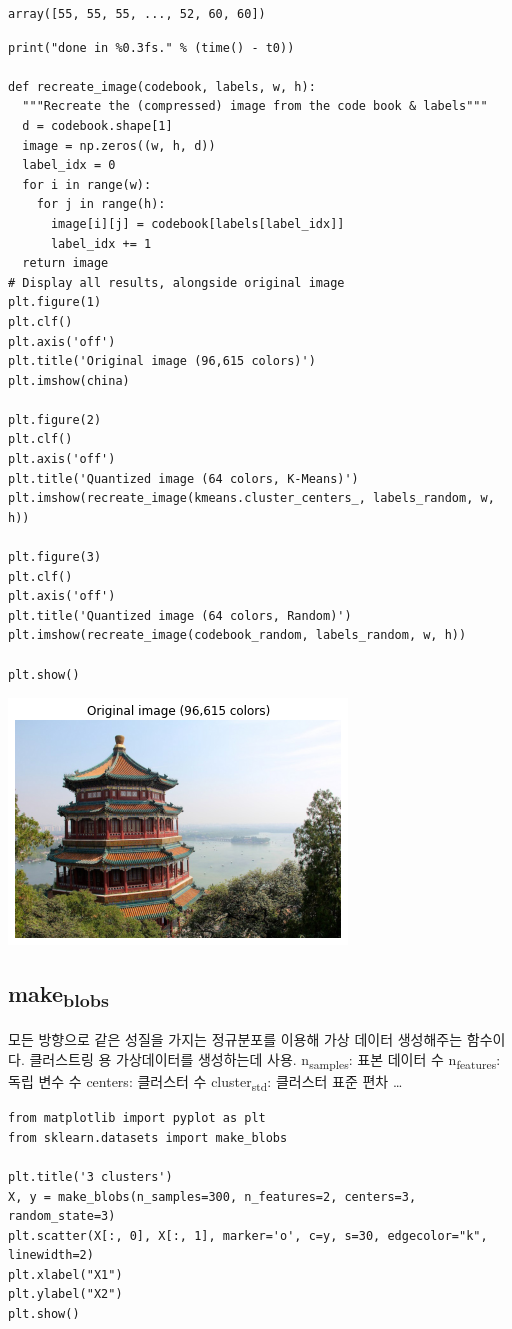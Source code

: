 \documentclass[11pt]{article}
\begin{document}
\begin{verbatim}
array([55, 55, 55, ..., 52, 60, 60])
\end{verbatim}

\begin{verbatim}
print("done in %0.3fs." % (time() - t0))

def recreate_image(codebook, labels, w, h):
  """Recreate the (compressed) image from the code book & labels"""
  d = codebook.shape[1]
  image = np.zeros((w, h, d))
  label_idx = 0
  for i in range(w):
    for j in range(h):
      image[i][j] = codebook[labels[label_idx]]
      label_idx += 1
  return image
# Display all results, alongside original image
plt.figure(1)
plt.clf()
plt.axis('off')
plt.title('Original image (96,615 colors)')
plt.imshow(china)

plt.figure(2)
plt.clf()
plt.axis('off')
plt.title('Quantized image (64 colors, K-Means)')
plt.imshow(recreate_image(kmeans.cluster_centers_, labels_random, w, h))

plt.figure(3)
plt.clf()
plt.axis('off')
plt.title('Quantized image (64 colors, Random)')
plt.imshow(recreate_image(codebook_random, labels_random, w, h))

plt.show()
\end{verbatim}

\begin{center}
\includegraphics[width=.9\linewidth]{./obipy-resources/x2RJsY.png}
\end{center}

\subsection{make\textsubscript{blobs}}
\label{sec:org069d211}
모든 방향으로 같은 성질을 가지는 정규분포를 이용해 가상 데이터 생성해주는 함수이다. 클러스트링 용 가상데이터를 생성하는데 사용.
n\textsubscript{samples}: 표본 데이터 수
n\textsubscript{features}: 독립 변수 수
centers: 클러스터 수
cluster\textsubscript{std}: 클러스터 표준 편차
\ldots{}
\begin{verbatim}
from matplotlib import pyplot as plt
from sklearn.datasets import make_blobs

plt.title('3 clusters')
X, y = make_blobs(n_samples=300, n_features=2, centers=3, random_state=3)
plt.scatter(X[:, 0], X[:, 1], marker='o', c=y, s=30, edgecolor="k", linewidth=2)
plt.xlabel("X1")
plt.ylabel("X2")
plt.show()
\end{verbatim}
\end{document}

